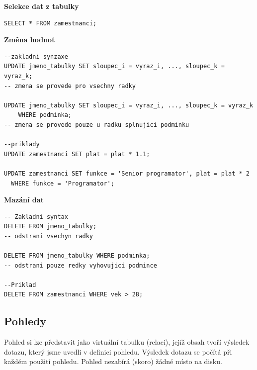 \documentclass[10pt,a4paper]{article}
\begin{document}
\noindent\textbf{Selekce dat z tabulky}
\begin{lstlisting}
SELECT * FROM zamestnanci;
\end{lstlisting}

\noindent\textbf{Změna hodnot}

\begin{lstlisting}
--zakladni synzaxe
UPDATE jmeno_tabulky SET sloupec_i = vyraz_i, ..., sloupec_k = vyraz_k;
-- zmena se provede pro vsechny radky

UPDATE jmeno_tabulky SET sloupec_i = vyraz_i, ..., sloupec_k = vyraz_k 
	WHERE podminka;
-- zmena se provede pouze u radku splnujici podminku

--priklady
UPDATE zamestnanci SET plat = plat * 1.1;

UPDATE zamestnanci SET funkce = 'Senior programator', plat = plat * 2 
  WHERE funkce = 'Programator';
\end{lstlisting}


\noindent\textbf{Mazání dat}
\begin{lstlisting}
-- Zakladni syntax
DELETE FROM jmeno_tabulky;
-- odstrani vsechyn radky

DELETE FROM jmeno_tabulky WHERE podminka;
-- odstrani pouze redky vyhovujici podmince

--Priklad 
DELETE FROM zamestnanci WHERE vek > 28;
\end{lstlisting}


\subsection{Pohledy}
Pohled si lze představit jako virtuální tabulku (relaci), jejíž obsah tvoří výsledek dotazu, který jsme uvedli v definici pohledu. Výsledek dotazu se počítá při každém použití pohledu. Pohled nezabírá (skoro) žádné místo na disku.
\end{document}
